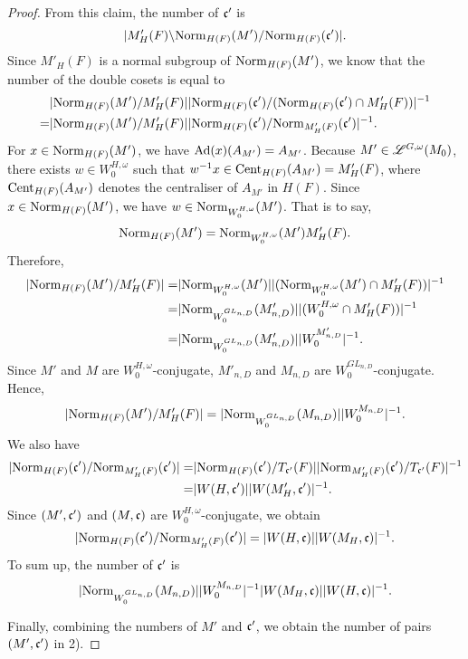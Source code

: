 \documentclass[a4paper]{amsart}
\theoremstyle{definition}
\theoremstyle{remark}
\numberwithin{equation}{subsection}
\begin{document}
\begin{proof}
From this claim, the number of ${\mathfrak{c}}'$ is
$$ |M'_H(F)\backslash {\mathrm{Norm}}_{H(F)}(M')/{\mathrm{Norm}}_{H(F)}({\mathfrak{c}}')|. $$
Since $M'_H(F)$ is a normal subgroup of ${\mathrm{Norm}}_{H(F)}(M')$, we know that the number of the double cosets is equal to
\[\begin{split}
 &|{\mathrm{Norm}}_{H(F)}(M')/M'_H(F)||{\mathrm{Norm}}_{H(F)}({\mathfrak{c}}')/({\mathrm{Norm}}_{H(F)}({\mathfrak{c}}')\cap M'_H(F))|^{-1} \\
=&|{\mathrm{Norm}}_{H(F)}(M')/M'_H(F)||{\mathrm{Norm}}_{H(F)}({\mathfrak{c}}')/{\mathrm{Norm}}_{M'_H(F)}({\mathfrak{c}}')|^{-1}. 
\end{split}\]
For $x\in{\mathrm{Norm}}_{H(F)}(M')$, we have ${\mathrm{Ad}}(x)(A_{M'})=A_{M'}$. Because $M'\in\mathscr{L}^{G,\omega}(M_0)$, there exists $w\in W_0^{H,\omega}$ such that $w^{-1}x\in{\mathrm{Cent}}_{H(F)}(A_{M'})=M'_H(F)$, where ${\mathrm{Cent}}_{H(F)}(A_{M'})$ denotes the centraliser of $A_{M'}$ in $H(F)$. Since $x\in{\mathrm{Norm}}_{H(F)}(M')$, we have $w\in{\mathrm{Norm}}_{W_0^{H,\omega}}(M')$. That is to say, 
$$ {\mathrm{Norm}}_{H(F)}(M')={\mathrm{Norm}}_{W_0^{H,\omega}}(M') M'_H(F). $$
Therefore, 
\[\begin{split}
 |{\mathrm{Norm}}_{H(F)}(M')/M'_H(F)|=&|{\mathrm{Norm}}_{W_0^{H,\omega}}(M')||({\mathrm{Norm}}_{W_0^{H,\omega}}(M')\cap M'_H(F))|^{-1} \\
=&|{\mathrm{Norm}}_{W_0^{GL_{n,D}}}(M'_{n,D})||(W_0^{H,\omega}\cap M'_H(F))|^{-1} \\ 
=&|{\mathrm{Norm}}_{W_0^{GL_{n,D}}}(M'_{n,D})||W_0^{M'_{n,D}}|^{-1}. 
\end{split}\]
Since $M'$ and $M$ are $W_0^{H,\omega}$-conjugate, $M'_{n,D}$ and $M_{n,D}$ are $W_0^{GL_{n,D}}$-conjugate. Hence, 
$$ |{\mathrm{Norm}}_{H(F)}(M')/M'_H(F)|=|{\mathrm{Norm}}_{W_0^{GL_{n,D}}}(M_{n,D})||W_0^{M_{n,D}}|^{-1}. $$
We also have
\[\begin{split}
 |{\mathrm{Norm}}_{H(F)}({\mathfrak{c}}')/{\mathrm{Norm}}_{M'_H(F)}({\mathfrak{c}}')|=&|{\mathrm{Norm}}_{H(F)}({\mathfrak{c}}')/T_{{\mathfrak{c}}'}(F)||{\mathrm{Norm}}_{M'_H(F)}({\mathfrak{c}}')/T_{{\mathfrak{c}}'}(F)|^{-1} \\
=&|W(H,{\mathfrak{c}}')||W(M'_H,{\mathfrak{c}}')|^{-1}. 
\end{split}\]
Since $(M',{\mathfrak{c}}')$ and $(M,{\mathfrak{c}})$ are $W_0^{H,\omega}$-conjugate, we obtain
$$ |{\mathrm{Norm}}_{H(F)}({\mathfrak{c}}')/{\mathrm{Norm}}_{M'_H(F)}({\mathfrak{c}}')|=|W(H,{\mathfrak{c}})||W(M_H,{\mathfrak{c}})|^{-1}. $$
To sum up, the number of ${\mathfrak{c}}'$ is
$$ |{\mathrm{Norm}}_{W_0^{GL_{n,D}}}(M_{n,D})||W_0^{M_{n,D}}|^{-1}|W(M_H,{\mathfrak{c}})||W(H,{\mathfrak{c}})|^{-1}. $$

Finally, combining the numbers of $M'$ and ${\mathfrak{c}}'$, we obtain the number of pairs $(M',{\mathfrak{c}}')$ in 2).
\end{proof}
\end{document}
